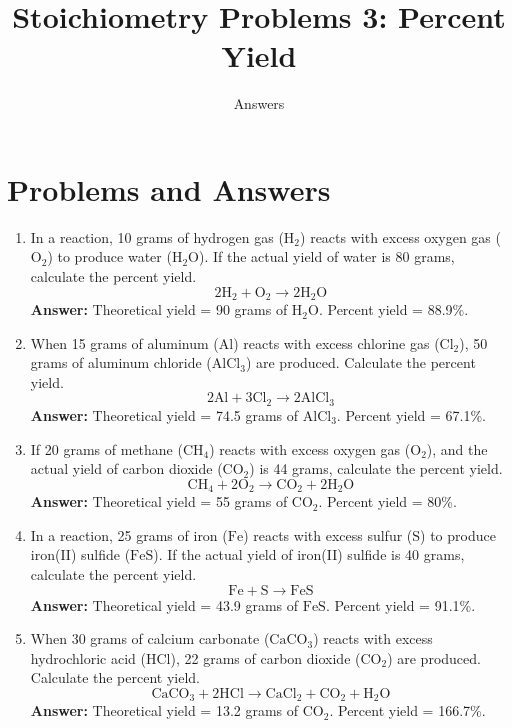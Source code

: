 \documentclass{article}
\title{Stoichiometry Problems 3: Percent Yield}
\author{Answers}
\date{}
\begin{document}
\maketitle

\section*{Problems and Answers}

\begin{enumerate}
    \item In a reaction, 10 grams of hydrogen gas (\(\text{H}_2\)) reacts with excess oxygen gas (\(\text{O}_2\)) to produce water (\(\text{H}_2\text{O}\)). If the actual yield of water is 80 grams, calculate the percent yield.
    \[
    2\text{H}_2 + \text{O}_2 \rightarrow 2\text{H}_2\text{O}
    \]
    \textbf{Answer:} Theoretical yield = 90 grams of \(\text{H}_2\text{O}\). Percent yield = 88.9\%.

    \item When 15 grams of aluminum (\(\text{Al}\)) reacts with excess chlorine gas (\(\text{Cl}_2\)), 50 grams of aluminum chloride (\(\text{AlCl}_3\)) are produced. Calculate the percent yield.
    \[
    2\text{Al} + 3\text{Cl}_2 \rightarrow 2\text{AlCl}_3
    \]
    \textbf{Answer:} Theoretical yield = 74.5 grams of \(\text{AlCl}_3\). Percent yield = 67.1\%.

    \item If 20 grams of methane (\(\text{CH}_4\)) reacts with excess oxygen gas (\(\text{O}_2\)), and the actual yield of carbon dioxide (\(\text{CO}_2\)) is 44 grams, calculate the percent yield.
    \[
    \text{CH}_4 + 2\text{O}_2 \rightarrow \text{CO}_2 + 2\text{H}_2\text{O}
    \]
    \textbf{Answer:} Theoretical yield = 55 grams of \(\text{CO}_2\). Percent yield = 80\%.

    \item In a reaction, 25 grams of iron (\(\text{Fe}\)) reacts with excess sulfur (\(\text{S}\)) to produce iron(II) sulfide (\(\text{FeS}\)). If the actual yield of iron(II) sulfide is 40 grams, calculate the percent yield.
    \[
    \text{Fe} + \text{S} \rightarrow \text{FeS}
    \]
    \textbf{Answer:} Theoretical yield = 43.9 grams of \(\text{FeS}\). Percent yield = 91.1\%.

    \item When 30 grams of calcium carbonate (\(\text{CaCO}_3\)) reacts with excess hydrochloric acid (\(\text{HCl}\)), 22 grams of carbon dioxide (\(\text{CO}_2\)) are produced. Calculate the percent yield.
    \[
    \text{CaCO}_3 + 2\text{HCl} \rightarrow \text{CaCl}_2 + \text{CO}_2 + \text{H}_2\text{O}
    \]
    \textbf{Answer:} Theoretical yield = 13.2 grams of \(\text{CO}_2\). Percent yield = 166.7\%.
\end{enumerate}
\end{document}
